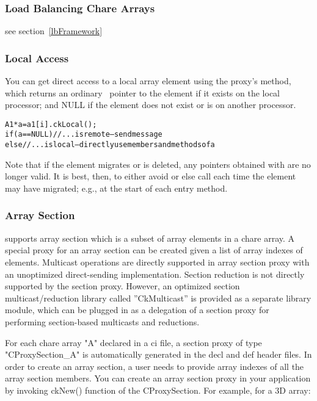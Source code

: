 \subsubsection{Load Balancing Chare Arrays}

see section~\ref{lbFramework}


\subsubsection{Local Access}

\experimental{}
\label{ckLocal for arrays}
You can get direct access to a local array element using the
proxy's  method, which returns an ordinary \CC\ pointer
to the element if it exists on the local processor; and NULL if
the element does not exist or is on another processor.

\begin{alltt}
A1 *a=a1[i].ckLocal();
if (a==NULL) //...is remote-- send message
else //...is local-- directly use members and methods of a
\end{alltt}

Note that if the element migrates or is deleted, any pointers 
obtained with  are no longer valid.  It is best,
then, to either avoid  or else call  
each time the element may have migrated; e.g., at the start 
of each entry method.


\subsubsection{Array Section}

\experimental{}
\label{array section}

\charmpp{} supports array section which is a subset of array 
elements in a chare array.
A special proxy for an array section can be created given a list of array
indexes of elements.
Multicast operations are directly supported in array section proxy with
an unoptimized direct-sending implementation.
Section reduction is not directly supported by the section proxy. 
However, an optimized section multicast/reduction 
library called ''CkMulticast'' is provided as a separate library module,
which can be plugged in as a delegation of a section proxy for performing
section-based multicasts and reductions. 

For each chare array "A" declared in a ci file, a section proxy 
of type "CProxySection\_A" is automatically generated in the decl and def 
header files. 
In order to create an array section, a user needs to provide array indexes 
of all the array section members.
You can create an array section proxy in your application by 
invoking ckNew() function of the CProxySection.
For example, for a 3D array:

